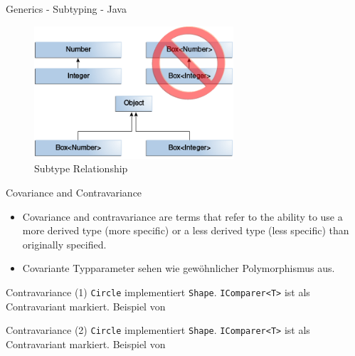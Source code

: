 \documentclass[11pt]{beamer}
\begin{document}
\begin{frame}{Generics - Subtyping - Java}
	\begin{figure}
			\includegraphics[width=0.66\textwidth]{bilder/generics-subtypeRelationship.png}
			\caption{Subtype Relationship \cite{java_generics_inheritance}}
	\end{figure}
\end{frame}

\begin{frame}{Covariance and Contravariance}
	\begin{itemize}
		\item \glqq Covariance and contravariance are terms that refer to the ability to use a more derived type (more specific) or a less derived type (less specific) than originally specified.\grqq{} \cite{csharp_docs_variance}
		\item Covariante Typparameter  sehen wie \glqq gewöhnlicher\grqq{} Polymorphismus aus.
	\end{itemize}

\end{frame}

\begin{frame}{Contravariance (1)}
\tiny{
\texttt{Circle} implementiert \texttt{Shape}. \texttt{IComparer<T>} ist als Contravariant markiert.}
Beispiel von \cite{csharp_example_contravariance}
\end{frame}

\begin{frame}{Contravariance (2)}
\tiny{
\texttt{Circle} implementiert \texttt{Shape}. \texttt{IComparer<T>} ist als Contravariant markiert.}
Beispiel von \cite{csharp_example_contravariance}
\end{frame}
\end{document}
